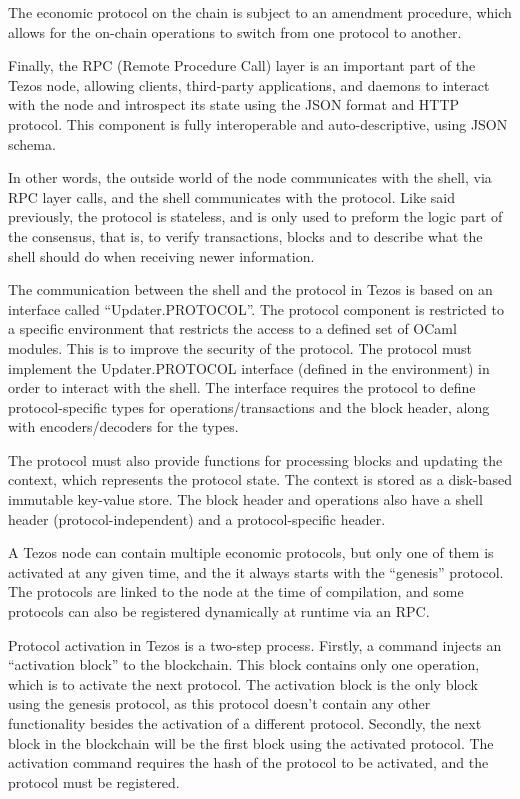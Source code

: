 The economic protocol on the chain is subject to an amendment procedure, which allows for the on-chain operations to switch from one protocol to another.

Finally, the RPC (Remote Procedure Call) layer is an important part of the Tezos node, allowing clients, third-party applications, and daemons to interact with the node and introspect its state using the JSON format and HTTP protocol. This component is fully interoperable and auto-descriptive, using JSON schema.

In other words, the outside world of the node communicates with the shell, via RPC layer calls, and the shell communicates with the protocol. Like said previously, the protocol is stateless, and is only used to preform the logic part of the consensus, that is, to verify transactions, blocks and to describe what the shell should do when receiving newer information.

The communication between the shell and the protocol in Tezos is based on an interface called ``Updater.PROTOCOL''.
The protocol component is restricted to a specific environment that restricts the access to a defined set of OCaml modules. This is to improve the security of the protocol.
The protocol must implement the Updater.PROTOCOL interface (defined in the environment) in order to interact with the shell. The interface requires the protocol to define protocol-specific types for operations/transactions and the block header, along with encoders/decoders for the types.

The protocol must also provide functions for processing blocks and updating the context, which represents the protocol state. The context is stored as a disk-based immutable key-value store. The block header and operations also have a shell header (protocol-independent) and a protocol-specific header.

A Tezos node can contain multiple economic protocols, but only one of them is activated at any given time, and the it always starts with the ``genesis'' protocol.
The protocols are linked to the node at the time of compilation, and some protocols can also be registered dynamically at runtime via an RPC.

Protocol activation in Tezos is a two-step process. Firstly, a command injects an ``activation block'' to the blockchain. This block contains only one operation, which is to activate the next protocol. The activation block is the only block using the genesis protocol, as this protocol doesn't contain any other functionality besides the activation of a different protocol.
Secondly, the next block in the blockchain will be the first block using the activated protocol. The activation command requires the hash of the protocol to be activated, and the protocol must be registered.

